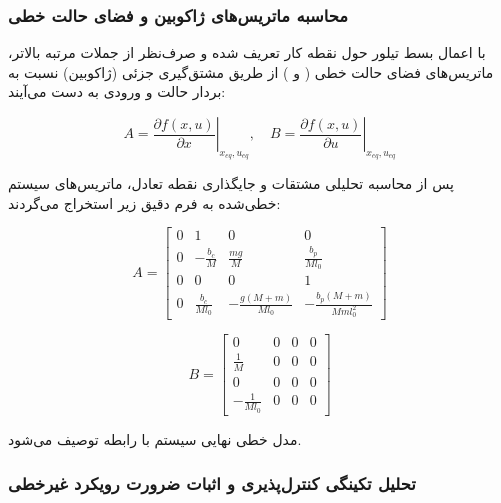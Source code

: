 \subsubsection{محاسبه ماتریس‌های ژاکوبین و فضای حالت خطی}

با اعمال بسط تیلور حول نقطه کار تعریف شده و صرف‌نظر از جملات مرتبه بالاتر، ماتریس‌های فضای حالت خطی ( و ) از طریق مشتق‌گیری جزئی (ژاکوبین) نسبت به بردار حالت و ورودی به دست می‌آیند:

\begin{equation}
    A = \left. \frac{\partial f(x,u)}{\partial x} \right|_{x_{eq}, u_{eq}}, \quad B = \left. \frac{\partial f(x,u)}{\partial u} \right|_{x_{eq}, u_{eq}}
\end{equation}

پس از محاسبه تحلیلی مشتقات و جایگذاری نقطه تعادل، ماتریس‌های سیستم خطی‌شده به فرم دقیق زیر استخراج می‌گردند:

\begin{equation}
    \renewcommand{\arraystretch}{1.8}
    A = \begin{bmatrix}
        0 & 1                 & 0                     & 0                           \\
        0 & -\frac{b_c}{M}    & \frac{mg}{M}          & \frac{b_p}{M l_0}           \\
        0 & 0                 & 0                     & 1                           \\
        0 & \frac{b_c}{M l_0} & -\frac{g(M+m)}{M l_0} & -\frac{b_p(M+m)}{M m l_0^2}
    \end{bmatrix}
\end{equation}

\begin{equation}
    \renewcommand{\arraystretch}{1.8}
    B = \begin{bmatrix}
        0                & 0 & 0 & 0 \\
        \frac{1}{M}      & 0 & 0 & 0 \\
        0                & 0 & 0 & 0 \\
        -\frac{1}{M l_0} & 0 & 0 & 0
    \end{bmatrix}
\end{equation}

مدل خطی نهایی سیستم با رابطه  توصیف می‌شود.

\subsubsection{تحلیل تکینگی کنترل‌پذیری و اثبات ضرورت رویکرد غیرخطی}

